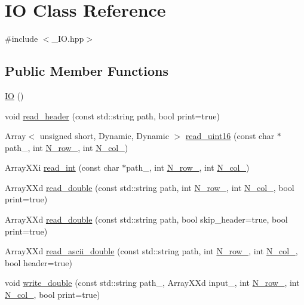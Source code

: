 \hypertarget{class_i_o}{}\section{IO Class Reference}
\label{class_i_o}


{\ttfamily \#include $<$\+\_\+\+I\+O.\+hpp$>$}

\subsection*{Public Member Functions}
\begin{DoxyCompactItemize}
\item 
\hyperlink{class_i_o_a49b27a2ee79bce0de4e3ef163cbebd30}{IO} ()
\item 
void \hyperlink{class_i_o_aed76c50d1122060292bfb10181edc990}{read\+\_\+header} (const std\+::string path, bool print=true)
\item 
Array$<$ unsigned short, Dynamic, Dynamic $>$ \hyperlink{class_i_o_a0ba1550dc3c2b6fd4675bc03408b8d95}{read\+\_\+uint16} (const char $\ast$path\+\_\+, int \hyperlink{class_i_o_ab8aa1490df2e2e758766030afdae3a40}{N\+\_\+row\+\_\+}, int \hyperlink{class_i_o_a64aae2d2be35348233f8ddac4d6791f2}{N\+\_\+col\+\_\+})
\item 
Array\+X\+Xi \hyperlink{class_i_o_a7b78b5f726c5299423e72b2b44bce0c9}{read\+\_\+int} (const char $\ast$path\+\_\+, int \hyperlink{class_i_o_ab8aa1490df2e2e758766030afdae3a40}{N\+\_\+row\+\_\+}, int \hyperlink{class_i_o_a64aae2d2be35348233f8ddac4d6791f2}{N\+\_\+col\+\_\+})
\item 
Array\+X\+Xd \hyperlink{class_i_o_aa2d53b758b98c564688d00ca5236744e}{read\+\_\+double} (const std\+::string path, int \hyperlink{class_i_o_ab8aa1490df2e2e758766030afdae3a40}{N\+\_\+row\+\_\+}, int \hyperlink{class_i_o_a64aae2d2be35348233f8ddac4d6791f2}{N\+\_\+col\+\_\+}, bool print=true)
\item 
Array\+X\+Xd \hyperlink{class_i_o_a34ed8843269915cb0b4eb8719da3535d}{read\+\_\+double} (const std\+::string path, bool skip\+\_\+header=true, bool print=true)
\item 
Array\+X\+Xd \hyperlink{class_i_o_a3ddd4b5d95a8a5cfffb56cfcf7c186e1}{read\+\_\+ascii\+\_\+double} (const std\+::string path, int \hyperlink{class_i_o_ab8aa1490df2e2e758766030afdae3a40}{N\+\_\+row\+\_\+}, int \hyperlink{class_i_o_a64aae2d2be35348233f8ddac4d6791f2}{N\+\_\+col\+\_\+}, bool header=true)
\item 
void \hyperlink{class_i_o_a9a648215dc5e33abe2c5a8916fff06d4}{write\+\_\+double} (const std\+::string path\+\_\+, Array\+X\+Xd input\+\_\+, int \hyperlink{class_i_o_ab8aa1490df2e2e758766030afdae3a40}{N\+\_\+row\+\_\+}, int \hyperlink{class_i_o_a64aae2d2be35348233f8ddac4d6791f2}{N\+\_\+col\+\_\+}, bool print=true)

\end{DoxyCompactItemize}
